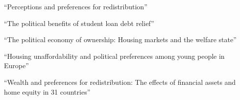 \documentclass{article}
\begin{document}
\medskip \noindent \textbf{\cite{stantcheva2021perceptions}} ``Perceptions and preferences for redistribution''

\medskip \noindent \textbf{\cite{sorelle2023political}} ``The political benefits of student loan debt relief''

\medskip \noindent \textbf{\cite{ansell2014political}} ``The political economy of ownership: Housing markets and the welfare state''

\medskip \noindent \textbf{\cite{furtado2025housing}} ``Housing unaffordability and political preferences among young people in Europe''

\medskip \noindent \textbf{\cite{steele2020wealth}} ``Wealth and preferences for redistribution: The effects of financial assets and home equity in 31 countries''


\end{document}
